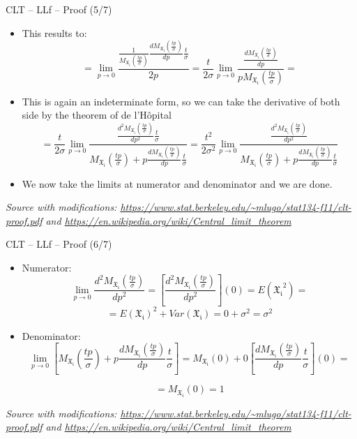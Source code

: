 \documentclass{beamer}
\begin{document}
\begin{frame}
{\centerline{CLT -- LLf -- Proof (5/7)}}

\begin{itemize}
\item This results to:
$$= \lim_{p \to 0} \frac{ \frac{1}{M_\mathfrak{X_i}(\frac{tp}{\sigma})} \frac{d M_\mathfrak{X_i}(\frac{tp}{\sigma})}{dp}\frac{t}{\sigma}}{2p} = \frac{t}{2\sigma}  \lim_{p \to 0} \frac{\frac{d M_\mathfrak{X_i}(\frac{tp}{\sigma})}{dp}}{pM_\mathfrak{X_i}(\frac{tp}{\sigma})} = $$
\item This is again an indeterminate form, so we can take the derivative of both side by the theorem of de l'H\^{o}pital
$$= \frac{t}{2\sigma} \lim_{p \to 0} \frac{ \frac{d^2 M_\mathfrak{X_i}(\frac{tp}{\sigma})}{dp^2}\frac{t}{\sigma} }
{M_\mathfrak{X_i}(\frac{tp}{\sigma})+ p \frac{d M_\mathfrak{X_i}(\frac{tp}{\sigma})}{dp}\frac{t}{\sigma}} =
 \frac{t^2}{2\sigma^2} \lim_{p \to 0} \frac{ \frac{d^2 M_\mathfrak{X_i}(\frac{tp}{\sigma})}{dp^2} }
{M_\mathfrak{X_i}(\frac{tp}{\sigma})+ p \frac{d M_\mathfrak{X_i}(\frac{tp}{\sigma})}{dp}\frac{t}{\sigma}}
$$
\item We now take the limits at numerator and denominator and we are done.

\end{itemize}

\textit{\tiny
\vspace{-\baselineskip}
Source with modifications: \url{https://www.stat.berkeley.edu/~mlugo/stat134-f11/clt-proof.pdf} and \url{https://en.wikipedia.org/wiki/Central_limit_theorem}}
\end{frame}

\begin{frame}
{\centerline{CLT -- LLf -- Proof (6/7)}}

\begin{itemize}
\item Numerator:
$$ \lim_{p \to 0} \frac{d^2 M_\mathfrak{X_i}(\frac{tp}{\sigma})}{dp^2} = 
\left [ \frac{d^2 M_\mathfrak{X_i}(\frac{tp}{\sigma})}{dp^2} \right ] (0) = E(\mathfrak{X_i}^2) = $$
$$ = E(\mathfrak{X_i})^2 + Var(\mathfrak{X_i}) = 0 +\sigma^2 = \sigma^2 $$
\item Denominator:
$$ \lim_{p \to 0} \left [ M_\mathfrak{X_i}(\frac{tp}{\sigma})+ p \frac{d M_\mathfrak{X_i}(\frac{tp}{\sigma})}{dp}\frac{t}{\sigma} \right ] = M_\mathfrak{X_i}(0) + 0 \left [  \frac{d M_\mathfrak{X_i}(\frac{tp}{\sigma})}{dp}\frac{t}{\sigma} \right ] (0) = $$

$$ =  M_\mathfrak{X_i}(0) = 1 $$
\end{itemize}

\textit{\tiny
\vspace{-\baselineskip}
Source with modifications: \url{https://www.stat.berkeley.edu/~mlugo/stat134-f11/clt-proof.pdf} and \url{https://en.wikipedia.org/wiki/Central_limit_theorem}}
\end{frame}
\end{document}
